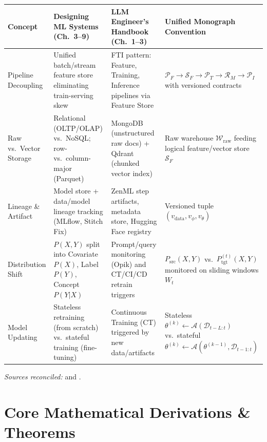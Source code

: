 \documentclass[../../../../master.tex]{subfiles}
\begin{document}
\begin{crossbook}
\label{tab:mlsys:notation}
\renewcommand{\arraystretch}{1.22}
\begin{tabularx}{\textwidth}{@{} >{\raggedright\arraybackslash}p{2.7cm} >{\raggedright\arraybackslash}p{4.1cm} >{\raggedright\arraybackslash}p{4.1cm} >{\raggedright\arraybackslash}X @{}}
\toprule
\textbf{Concept} & \textbf{Designing ML Systems (Ch.~3--9)} & \textbf{LLM Engineer's Handbook (Ch.~1--3)} & \textbf{Unified Monograph Convention} \\
\midrule
Pipeline Decoupling & Unified batch/stream feature store eliminating train-serving skew & FTI pattern: Feature, Training, Inference pipelines via Feature Store & $\mathcal{P}_F \to \mathcal{S}_F \to \mathcal{P}_T \to \mathcal{R}_M \to \mathcal{P}_I$ with versioned contracts \\
Raw vs.\ Vector Storage & Relational (OLTP/OLAP) vs.\ NoSQL; row- vs.\ column-major (Parquet) & MongoDB (unstructured raw docs) + Qdrant (chunked vector index) & Raw warehouse $\mathcal{W}_{\mathrm{raw}}$ feeding logical feature/vector store $\mathcal{S}_F$ \\
Lineage \& Artifact & Model store + data/model lineage tracking (MLflow, Stitch Fix) & ZenML step artifacts, metadata store, Hugging Face registry & Versioned tuple $(v_{\mathrm{data}}, v_{\phi}, v_{\theta})$ \\
Distribution Shift & $P(X,Y)$ split into Covariate $P(X)$, Label $P(Y)$, Concept $P(Y|X)$ & Prompt/query monitoring (Opik) and CT/CI/CD retrain triggers & $P_{\mathrm{src}}(X,Y)$ vs.\ $P_{\mathrm{tgt}}^{(t)}(X,Y)$ monitored on sliding windows $W_t$ \\
Model Updating & Stateless retraining (from scratch) vs.\ stateful training (fine-tuning) & Continuous Training (CT) triggered by new data/artifacts & Stateless $\theta^{(k)} \leftarrow \mathcal{A}(\mathcal{D}_{t-L:t})$ vs.\ stateful $\theta^{(k)} \leftarrow \mathcal{A}(\theta^{(k-1)}, \mathcal{D}_{t-1:t})$ \\
\bottomrule
\end{tabularx}
\vspace{4pt}
{\footnotesize\textit{Sources reconciled:}  and .}
\end{crossbook}

\section{Core Mathematical Derivations \& Theorems}\label{sec:mlsys:math}
\end{document}

